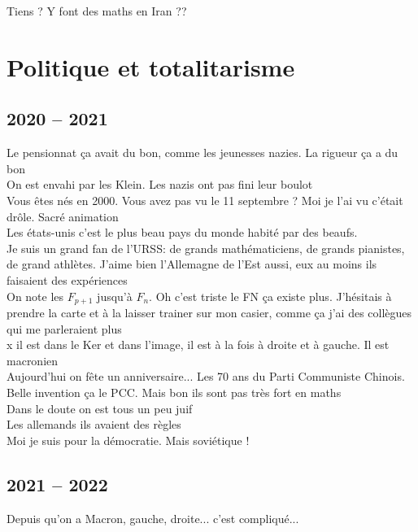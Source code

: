 \documentclass[french, a4paper, openany]{book}
\begin{document}
	\og Tiens ? Y font des maths en Iran ?? \fg \\

\chapter{Politique et totalitarisme}

\section{2020 -- 2021}

	\noindent \og Le pensionnat ça avait du bon, comme les jeunesses nazies. La rigueur ça a du bon \fg \\
	\og On est envahi par les Klein. Les nazis ont pas fini leur boulot \fg \\
	\og Vous êtes nés en 2000. Vous avez pas vu le 11 septembre ? Moi je l'ai vu c'était drôle. Sacré animation \fg \\
	\og Les états-unis c'est le plus beau pays du monde habité par des beaufs. \fg \\
	\og Je suis un grand fan de l'URSS: de grands mathématiciens, de grands pianistes, de grand athlètes. J'aime bien l'Allemagne de l'Est aussi, eux au moins ils faisaient des expériences \fg \\
	\og On note les $F_{p+1}$ jusqu'à $F_n$. Oh c'est triste le FN ça existe plus. J'hésitais à prendre la carte et à la laisser trainer sur mon casier, comme ça j'ai des collègues qui me parleraient plus \fg \\
	\og x il est dans le Ker et dans l'image, il est à la fois à droite et à gauche. Il est macronien \fg \\
	\og Aujourd'hui on fête un anniversaire... Les 70 ans du Parti Communiste Chinois. Belle invention ça le PCC. Mais bon ils sont pas très fort en maths \fg \\
	\og Dans le doute on est tous un peu juif \fg \\
	\og Les allemands ils avaient des règles \fg \\
	\og Moi je suis pour la démocratie. Mais soviétique ! \fg \\

\section{2021 -- 2022}
	
	\og Depuis qu'on a Macron, gauche, droite... c'est compliqué... \fg \\
\end{document}

